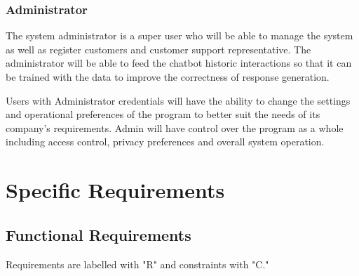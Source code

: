 \documentclass[11pt]{article}
\begin{document}
\subsubsection{Administrator}
The system administrator is a super user who will be able to manage the system as well as register customers and customer support representative. The administrator will be able to feed the chatbot historic interactions so that it can be trained with the data to improve the correctness of response generation.

Users with Administrator credentials will have the ability to change the settings and operational preferences of the program to better suit the needs of its company's requirements. Admin will have control over the program as a whole including access control, privacy preferences and overall system operation.

\section{Specific Requirements}

\subsection{Functional Requirements} %

Requirements are labelled with "R" and constraints with "C."
	
\end{document}
